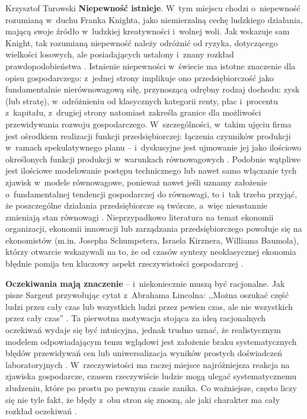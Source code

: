 \begin{artplenv}{Krzysztof Turowski}
\textbf{Niepewność istnieje}. W~tym miejscu chodzi o~niepewność rozumianą w~duchu Franka Knighta, jako niemierzalną
cechę ludzkiego działania, mającą swoje źródło w~ludzkiej kreatywności i~wolnej woli. Jak wskazuje sam Knight, tak
rozumianą niepewność należy odróżnić od ryzyka, dotyczącego wielkości losowych, ale posiadających ustalony i~znany
rozkład prawdopodobieństwa
\parencite{knight_risk_1921_tur}.
Istnienie niepewności w~świecie ma istotne
znaczenie dla opisu gospodarczego: z~jednej strony implikuje ono przedsiębiorczość jako fundamentalnie
nierównowagową siłę, przynoszącą odrębny rodzaj dochodu: zysk (lub stratę), w~odróżnieniu od klasycznych kategorii
renty, płac i~procentu z~kapitału, z~drugiej strony natomiast zakreśla granice dla możliwości przewidywania rozwoju
gospodarczego. W~szczególności, w~takim ujęciu firma jest ośrodkiem realizacji funkcji przedsiębiorczej: łączenia
czynników produkcji w~ramach spekulatywnego planu  --  i~dyskusyjne jest ujmowanie jej jako ilościowo określonych
funkcji produkcji w~warunkach równowagowych
\parencite{baumol_entrepreneurship_1968}.
Podobnie wątpliwe jest ilościowe
modelowanie postępu technicznego lub nawet samo włączanie tych zjawisk w~modele równowagowe, ponieważ nawet jeśli
uznamy założenie o~fundamentalnej tendencji gospodarczej do równowagi, to i~tak trzeba przyjąć, że poszczególne
działania przedsiębiorcze są twórcze, a~więc nieustannie zmieniają stan równowagi
\parencite{schumpeter_creative_1947}.
Nieprzypadkowo literatura na temat ekonomii organizacji, ekonomii innowacji lub zarządzania przedsiębiorczego
powołuje się na ekonomistów (m.in. Josepha Schumpetera, Israela Kirznera, Williama Baumola), którzy otwarcie wskazywali
na to, że od czasów syntezy neoklasycznej ekonomia błędnie pomija ten kluczowy aspekt rzeczywistości gospodarczej
\parencite{foss_organizing_2012}.

\textbf{Oczekiwania mają znaczenie}  --  i~niekoniecznie muszą być racjonalne. Jak pisze Sargent przywołując cytat
z~Abrahama Lincolna: ,,Można oszukać część ludzi przez cały czas lub wszystkich ludzi przez pewien czas, ale nie
wszystkich przez cały czas''
\parencite{henderson_rational_2008}.
Ta pierwotna motywacja stojąca za ideą
racjonalnych oczekiwań wydaje się być intuicyjna, jednak trudno uznać, że realistycznym modelem odpowiadającym temu
wglądowi jest założenie braku systematycznych błędów przewidywań cen lub uniwersalizacja wyników prostych doświadczeń
laboratoryjnych
\parencite{colander_financial_2009}.
W~rzeczywistości ma raczej miejsce najróżniejsza
reakcja na zjawiska gospodarcze, czasem rzeczywiście ludzie mogą ulegać systematycznemu złudzeniu, które po prostu po
pewnym czasie zanika. Co ważniejsze, często liczy się nie tyle fakt, że błędy z~obu stron się znoszą, ale jaki
charakter ma cały rozkład oczekiwań
\parencite{lachmann_macro-economic_1973}.


\end{artplenv}
